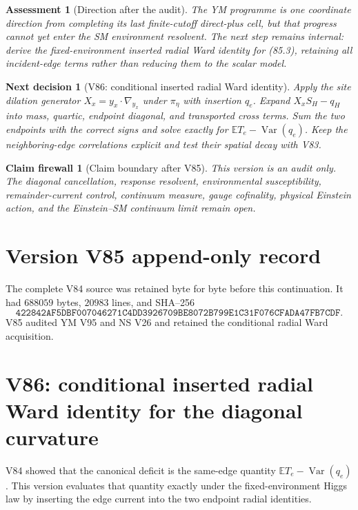 \documentclass[11pt]{article}
\newtheorem{firewall}[theorem]{Claim firewall}
\newtheorem{decision}[theorem]{Next decision}
\newtheorem{assessment}[theorem]{Assessment}
\theoremstyle{remark}
\begin{document}
\begin{assessment}[Direction after the audit]
\label{ass:v17v85-direction}
The YM programme is one coordinate direction from completing its last
finite-cutoff direct-plus cell, but that progress cannot yet enter the
SM environment resolvent.  The next step remains internal: derive the
fixed-environment inserted radial Ward identity for (85.3), retaining
all incident-edge terms rather than reducing them to the scalar model.
\end{assessment}

\begin{decision}[V86: conditional inserted radial Ward identity]
\label{dec:v17v85-next}
Apply the site dilation generator \(X_x=y_x\cdot\nabla_{y_x}\) under
\(\pi_\eta\) with insertion \(q_e\).  Expand
\(X_xS_H-q_H\) into mass, quartic, endpoint diagonal, and transported
cross terms.  Sum the two endpoints with the correct signs and solve
exactly for \(\mathbb ET_e-\operatorname{Var}(q_e)\).  Keep the
neighboring-edge correlations explicit and test their spatial decay
with V83.
\end{decision}

\begin{firewall}[Claim boundary after V85]
\label{fire:v17v85}
This version is an audit only.  The diagonal cancellation, response
resolvent, environmental susceptibility, remainder-current control,
continuum measure, gauge cofinality, physical Einstein action, and the
Einstein--SM continuum limit remain open.
\end{firewall}

\section*{Version V85 append-only record}
The complete V84 source was retained byte for byte before this
continuation.  It had \(688059\) bytes, \(20983\) lines, and SHA--256
\[
 \texttt{422842AF5DBF007046271C4DD3926709BE8072B799E1C31F076CFADA47FB7CDF}.
\]
V85 audited YM V95 and NS V26 and retained the conditional radial Ward
acquisition.


\section{V86: conditional inserted radial Ward identity for the diagonal curvature}
\label{sec:v17v86}

V84 showed that the canonical deficit is the same-edge quantity
\(\mathbb ET_e-\operatorname{Var}(q_e)\).  This version evaluates that
quantity exactly under the fixed-environment Higgs law by inserting
the edge current into the two endpoint radial identities.
\end{document}

